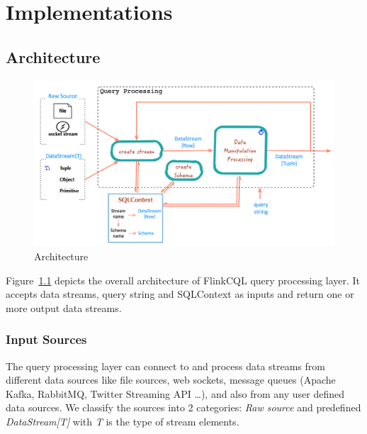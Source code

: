 
\chapter{Implementations}

\ifpdf
    \graphicspath{{Chapter5/Figs/Raster/}{Chapter5/Figs/PDF/}{Chapter5/Figs/}}
\else
    \graphicspath{{Chapter5/Figs/Vector/}{Chapter5/Figs/}}
\fi

\section{Architecture}

\begin{figure}[h!] 
\centering    
\includegraphics[width=1\textwidth]{Architecture}
\caption{Architecture}
\label{fig:Architecture}
\end{figure}


Figure~\ref{fig:Architecture} depicts the overall architecture of FlinkCQL query processing layer. It accepts data streams, query string and SQLContext as inputs and return one or more output data streams.
\subsection{Input Sources}
The query processing layer can connect to and process data streams from different data sources like file sources, web sockets, message queues (Apache Kafka, RabbitMQ, Twitter Streaming API …), and also from any user defined data sources. We classify the sources into 2 categories: \textit{Raw source} and predefined \textit{DataStream[T]} with \textit{T} is the type of stream elements.

